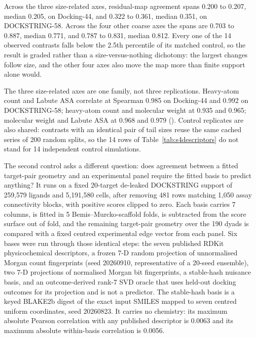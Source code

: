 Across the three size-related axes, residual-map agreement spans 0.200 to 0.207, median 0.205,
on Docking-44, and 0.322 to 0.361, median 0.351, on DOCKSTRING-58. Across the four other coarse
axes the spans are 0.703 to 0.887, median 0.771, and 0.787 to 0.831, median 0.812. Every one of
the 14 observed contrasts falls below the 2.5th percentile of its matched control, so the
result is graded rather than a size-versus-nothing dichotomy: the largest changes follow size,
and the other four axes also move the map more than finite support alone would.

The three size-related axes are one family, not three replications. Heavy-atom count and Labute
ASA correlate at Spearman 0.985 on Docking-44 and 0.992 on DOCKSTRING-58; heavy-atom count and
molecular weight at 0.935 and 0.965; molecular weight and Labute ASA at 0.968 and 0.979
(). Control replicates are also shared: contrasts with an
identical pair of tail sizes reuse the same cached series of 200 random splits, so the 14 rows
of Table~\ref{tab:s4descriptors} do not stand for 14 independent control simulations.

The second control asks a different question: does agreement between a fitted target-pair
geometry and an experimental panel require the fitted basis to predict anything? It runs on a
fixed 20-target de-leaked DOCKSTRING support of 259{,}579 ligands and 5{,}191{,}580 cells, after
removing 481 rows matching 1{,}050 assay connectivity blocks, with positive scores clipped to
zero. Each basis carries 7 columns, is fitted in 5 Bemis--Murcko-scaffold folds, is subtracted
from the score surface out of fold, and the remaining target-pair geometry over the 190 dyads is
compared with a fixed centred experimental edge vector from each panel. Six bases were run
through those identical steps: the seven published RDKit physicochemical descriptors, a frozen
7-D random projection of unnormalised Morgan count fingerprints (seed 20260910, representative
of a 20-seed ensemble), two 7-D projections of normalised Morgan bit fingerprints, a
stable-hash nuisance basis, and an outcome-derived rank-7 SVD oracle that uses held-out docking
outcomes for its projection and is not a predictor. The stable-hash basis is a keyed BLAKE2b
digest of the exact input SMILES mapped to seven centred uniform coordinates, seed 20260823. It
carries no chemistry: its maximum absolute Pearson correlation with any published descriptor is
0.0063 and its maximum absolute within-basis correlation is 0.0056.

